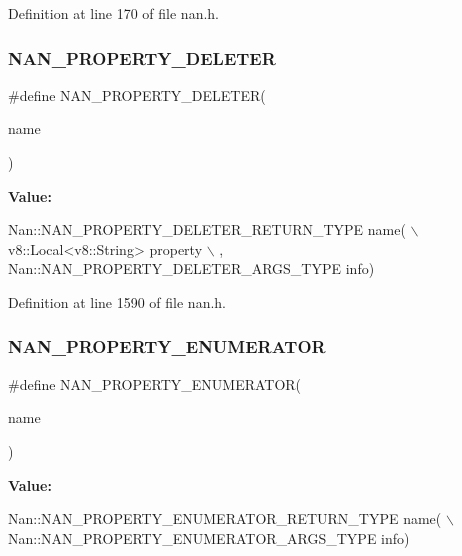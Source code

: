 Definition at line 170 of file nan.\+h.

\mbox{\label{nan_8h_a7e5afc01b91d09416a607a5e7ea20f73}} 
\subsubsection{N\+A\+N\+\_\+\+P\+R\+O\+P\+E\+R\+T\+Y\+\_\+\+D\+E\+L\+E\+T\+ER}
{\footnotesize\ttfamily \#define N\+A\+N\+\_\+\+P\+R\+O\+P\+E\+R\+T\+Y\+\_\+\+D\+E\+L\+E\+T\+ER(\begin{DoxyParamCaption}\item[{}]{name }\end{DoxyParamCaption})}

{\bfseries Value\+:}
\begin{DoxyCode}
Nan::NAN_PROPERTY_DELETER_RETURN_TYPE name(                                \(\backslash\)
        v8::Local<v8::String> property                                         \(\backslash\)
      , Nan::NAN_PROPERTY_DELETER_ARGS_TYPE info)
\end{DoxyCode}


Definition at line 1590 of file nan.\+h.

\mbox{\label{nan_8h_a566b9e7678dcd2be34fec1870bc9e250}} 
\subsubsection{N\+A\+N\+\_\+\+P\+R\+O\+P\+E\+R\+T\+Y\+\_\+\+E\+N\+U\+M\+E\+R\+A\+T\+OR}
{\footnotesize\ttfamily \#define N\+A\+N\+\_\+\+P\+R\+O\+P\+E\+R\+T\+Y\+\_\+\+E\+N\+U\+M\+E\+R\+A\+T\+OR(\begin{DoxyParamCaption}\item[{}]{name }\end{DoxyParamCaption})}

{\bfseries Value\+:}
\begin{DoxyCode}
Nan::NAN_PROPERTY_ENUMERATOR_RETURN_TYPE name(                             \(\backslash\)
        Nan::NAN_PROPERTY_ENUMERATOR_ARGS_TYPE info)
\end{DoxyCode}



